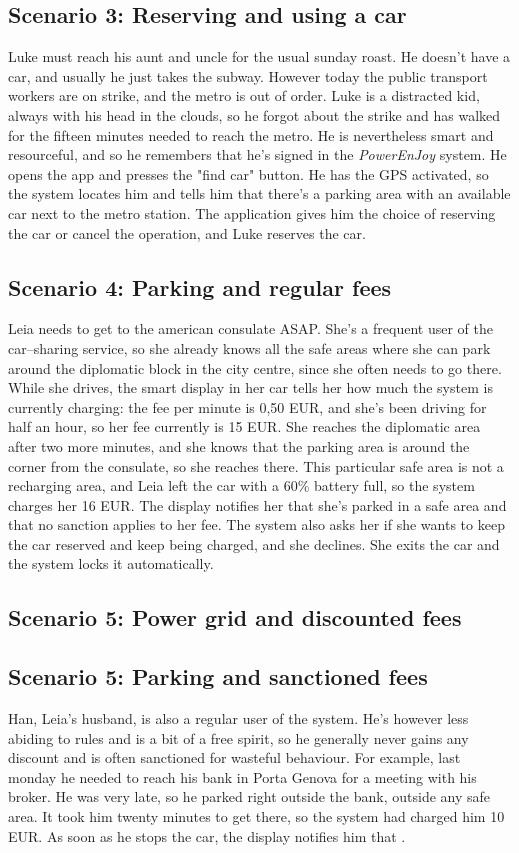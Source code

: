 \subsection{Scenario 3: Reserving and using a car}
	Luke must reach his aunt and uncle for the usual sunday roast. He doesn't have a car, and usually he just takes the subway. However today the public transport workers are on strike, and the metro is out of order. Luke is a distracted kid, always with his head in the clouds, so he forgot about the strike and has walked for the fifteen minutes needed to reach the metro. He is nevertheless smart and resourceful, and so he remembers that he's signed in the \textit{PowerEnJoy} system. He opens the app and presses the "find car" button. He has the GPS activated, so the system locates him and tells him that there's a parking area with an available car next to the metro station. The application gives him the choice of reserving the car or cancel the operation, and Luke reserves the car. 
	
\subsection{Scenario 4: Parking and regular fees}
	Leia needs to get to the american consulate ASAP. She's a frequent user of the car–sharing service, so she already knows all the safe areas where she can park around the diplomatic block in the city centre, since she often needs to go there. While she drives, the smart display in her car tells her how much the system is currently charging: the fee per minute is 0,50 EUR, and she's been driving for half an hour, so her fee currently is 15 EUR. She reaches the diplomatic area after two more minutes, and she knows that the parking area is around the corner from the consulate, so she reaches there. This particular safe area is not a recharging area, and Leia left the car with a 60\% battery full, so the system charges her 16 EUR. The display notifies her that she's parked in a safe area and that no sanction applies to her fee. The system also asks her if she wants to keep the car reserved and keep being charged, and she declines. She exits the car and the system locks it automatically. 
	
\subsection{Scenario 5: Power grid and discounted fees}
	
\subsection{Scenario 5: Parking and sanctioned fees}
	Han, Leia's husband, is also a regular user of the system. He's however less abiding to rules and is a bit of a free spirit, so he generally never gains any discount and is often sanctioned for wasteful behaviour. For example, last monday he needed to reach his bank in Porta Genova for a meeting with his broker. He was very late, so he parked right outside the bank, outside any safe area. It took him twenty minutes to get there, so the system had charged him 10 EUR. As soon as he stops the car, the display notifies him that .

